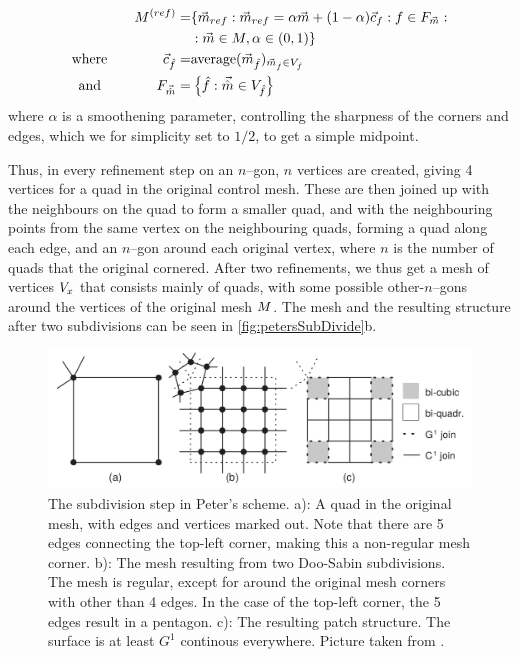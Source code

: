 \begin{align}
\petersControlMesh^{(ref)} =& \lbrace \petersControlMeshVec_{ref} \suchthat\petersControlMeshVec_{ref} = \alpha\petersControlMeshVec + (1-\alpha)\centroidof{f} \suchthat f \in \facesof{\petersControlMeshVec} \suchthat
\\ \notag &
 \suchthat \petersControlMeshVec \in \petersControlMesh, \alpha \in (0,1) \rbrace
\\
\where \qquad\qquad \centroidof{\hat{f}} =& \text{average}(\petersControlMeshVec_{\hat{f}})_{\petersControlMeshVec_{\hat{f}} \in \verticesof{\hat{f}}}
\\
\text{and} \qquad\qquad F_{\vec{\hat{m}}} =& \left\lbrace \hat{f} \suchthat \vec{\hat{m}} \in \verticesof{\hat{f}}	\right\rbrace
\end{align}
where $\alpha$ is a smoothening parameter, controlling the sharpness of the corners and edges, which we for simplicity set to $1/2$, to get a simple midpoint.

Thus, in every refinement step on an $n$--gon, $n$ vertices are created, giving 4 vertices for a quad in the original control mesh. These are then joined up with the neighbours on the quad to form a smaller quad, and with the neighbouring points from the same vertex on the neighbouring quads, forming a quad along each edge, and an $n$--gon around each original vertex, where $n$ is the number of quads that the original cornered. After two refinements, we thus get a mesh of vertices $\petersPatchPoints$ that consists mainly of quads, with some possible other-$n$--gons around the vertices of the original mesh $\petersControlMesh$. The mesh and the resulting structure after two subdivisions can be seen in \autoref{fig:petersSubDivide}b.

\begin{figure}
	\centering
	\includegraphics[width = \textwidth]{Pictures/NURBS/petersQuad_to_patches.png}
	\caption{The subdivision step in Peter's scheme. a): A quad in the original mesh, with edges and vertices marked out. Note that there are 5 edges connecting the top-left corner, making this a non-regular mesh corner. b): The mesh resulting from two Doo-Sabin subdivisions. The mesh is regular, except for around the original mesh corners with other than 4 edges. In the case of the top-left corner, the 5 edges result in a pentagon. c): The resulting \Bez patch structure. The surface is at least $G^1$ continous everywhere. Picture taken from \cite{eck1996automatic}.}
	\label{fig:petersSubDivide}
\end{figure}

